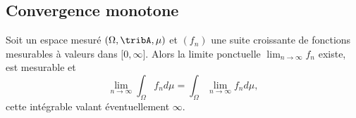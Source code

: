 \subsection{Convergence monotone}

\begin{theorem} \label{ThoRRDooFUvEAN}
    Soit un espace mesuré \( (\Omega,\tribA,\mu)\) et \( (f_n)\) une suite croissante de fonctions mesurables à valeurs dans \( \mathopen[ 0 , \infty \mathclose]\). Alors la limite ponctuelle \( \lim_{n\to \infty} f_n\) existe, est mesurable et
    \begin{equation}    \label{EqFHqCmLV}
        \lim_{n\to \infty} \int_{\Omega}f_nd\mu= \int_{\Omega}\lim_{n\to \infty} f_nd\mu,
    \end{equation}
    cette intégrable valant éventuellement \( \infty\).
\end{theorem}

